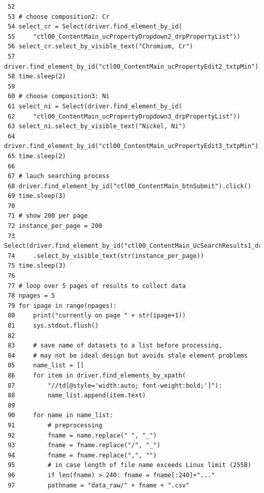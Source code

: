 \documentclass[10pt,aps,prb,amsmath,amssymb,twocolumn,letterpaper,nobalancelastpage,final,citeautoscript,floatfix,raggedbottom,superscriptaddress]{revtex4-1}
\begin{document}
\begin{lstlisting}
 52 
 53 # choose composition2: Cr
 54 select_cr = Select(driver.find_element_by_id(
 55     "ctl00_ContentMain_ucPropertyDropdown2_drpPropertyList"))
 56 select_cr.select_by_visible_text("Chromium, Cr")
 57 driver.find_element_by_id("ctl00_ContentMain_ucPropertyEdit2_txtpMin").send_keys("0.0")
 58 time.sleep(2)
 59 
 60 # choose composition3: Ni
 61 select_ni = Select(driver.find_element_by_id(
 62     "ctl00_ContentMain_ucPropertyDropdown3_drpPropertyList"))
 63 select_ni.select_by_visible_text("Nickel, Ni")
 64 driver.find_element_by_id("ctl00_ContentMain_ucPropertyEdit3_txtpMin").send_keys("0.0")
 65 time.sleep(2)
 66 
 67 # lauch searching process
 68 driver.find_element_by_id("ctl00_ContentMain_btnSubmit").click()
 69 time.sleep(3)
 70 
 71 # show 200 per page
 72 instance_per_page = 200
 73 Select(driver.find_element_by_id("ctl00_ContentMain_UcSearchResults1_drpPageSize1"))
 74     .select_by_visible_text(str(instance_per_page))
 75 time.sleep(3)
 76 
 77 # loop over 5 pages of results to collect data
 78 npages = 5
 79 for ipage in range(npages):
 80     print("currently on page " + str(ipage+1))
 81     sys.stdout.flush()
 82 
 83     # save name of datasets to a list before processing,
 84     # may not be ideal design but avoids stale element problems
 85     name_list = []
 86     for item in driver.find_elements_by_xpath(
 87         "//td[@style='width:auto; font-weight:bold;']"):
 88         name_list.append(item.text)
 89 
 90     for name in name_list:
 91         # preprocessing
 92         fname = name.replace(" ", "_")
 93         fname = fname.replace("/", "_")
 94         fname = fname.replace(",", "")
 95         # in case length of file name exceeds Linux limit (255B)
 96         if len(fname) > 240: fname = fname[:240]+"..."
 97         pathname = "data_raw/" + fname + ".csv"
\end{lstlisting}
\clearpage
\end{document}
